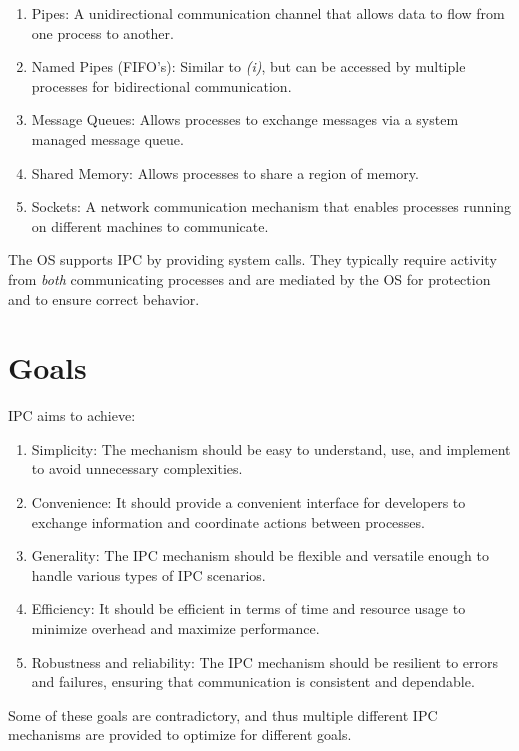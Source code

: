 \documentclass{report}
\begin{document}
\begin{enumerate}[label=\textit{(\roman*)}]
\item Pipes: A unidirectional communication channel that allows data to flow from one process
  to another.
\item Named Pipes (FIFO's): Similar to \textit{(i)}, but can be accessed by multiple processes for
  bidirectional communication.
\item Message Queues: Allows processes to exchange messages via a system managed message queue.
\item Shared Memory: Allows processes to share a region of memory.
\item Sockets: A network communication mechanism that enables processes running on different
  machines to communicate.
\end{enumerate}
The OS supports IPC by providing system calls. They typically require activity from \textit{both}
communicating processes and are mediated by the OS for protection and to ensure correct behavior.





\section{Goals}
IPC aims to achieve:

\begin{enumerate}[label=\textit{(\roman*)}]
\item Simplicity: The mechanism should be easy to understand, use, and implement to avoid
  unnecessary complexities.
\item Convenience: It should provide a convenient interface for developers to exchange information
  and coordinate actions between processes.
\item Generality: The IPC mechanism should be flexible and versatile enough to handle various types
  of IPC scenarios.
\item Efficiency: It should be efficient in terms of time and resource usage to minimize overhead
  and maximize performance.
\item Robustness and reliability: The IPC mechanism should be resilient to errors and failures,
  ensuring that communication is consistent and dependable.
\end{enumerate}
Some of these goals are contradictory, and thus multiple different IPC mechanisms are provided to
optimize for different goals.
\end{document}
